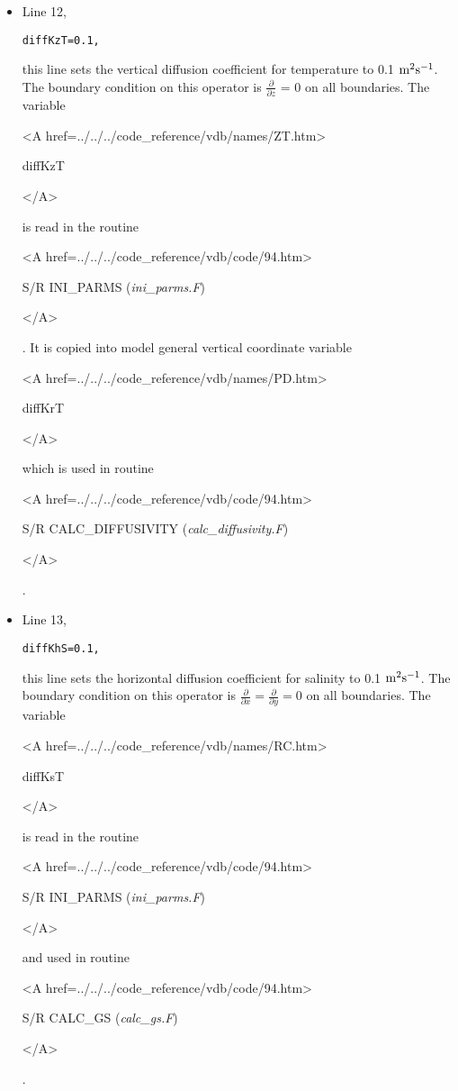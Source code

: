 \begin{itemize}
\item Line 12,
\begin{verbatim}
diffKzT=0.1,
\end{verbatim}
this line sets the vertical diffusion coefficient for temperature
to 0.1 ${\rm m^{2}s^{-1}}$. The boundary condition on this
operator is $\frac{\partial}{\partial z}$ = 0 on all boundaries.
The variable
{\bf
\begin{rawhtml} <A href=../../../code_reference/vdb/names/ZT.htm> \end{rawhtml}
diffKzT
\begin{rawhtml} </A>\end{rawhtml}
}
is read in the routine
{\it
\begin{rawhtml} <A href=../../../code_reference/vdb/code/94.htm> \end{rawhtml}
S/R INI\_PARMS ({\it ini\_parms.F})
\begin{rawhtml} </A>\end{rawhtml}
}.
It is copied into model general vertical coordinate variable
{\bf
\begin{rawhtml} <A href=../../../code_reference/vdb/names/PD.htm> \end{rawhtml}
diffKrT
\begin{rawhtml} </A>\end{rawhtml}
} which is used in routine 
{\it 
\begin{rawhtml} <A href=../../../code_reference/vdb/code/94.htm> \end{rawhtml}
S/R CALC\_DIFFUSIVITY ({\it calc\_diffusivity.F})
\begin{rawhtml} </A>\end{rawhtml}
}.


\item Line 13,
\begin{verbatim}
diffKhS=0.1,
\end{verbatim}
this line sets the horizontal diffusion coefficient for salinity
to 0.1 $\rm m^{2}s^{-1}$. The boundary condition on this
operator is $\frac{\partial}{\partial x}=\frac{\partial}{\partial y}=0$ on
all boundaries.
The variable
{\bf
\begin{rawhtml} <A href=../../../code_reference/vdb/names/RC.htm> \end{rawhtml}
diffKsT
\begin{rawhtml} </A>\end{rawhtml}
}
is read in the routine
{\it
\begin{rawhtml} <A href=../../../code_reference/vdb/code/94.htm> \end{rawhtml}
S/R INI\_PARMS ({\it ini\_parms.F})
\begin{rawhtml} </A>\end{rawhtml}
} and used in routine 
{\it
\begin{rawhtml} <A href=../../../code_reference/vdb/code/94.htm> \end{rawhtml}
S/R CALC\_GS ({\it calc\_gs.F})
\begin{rawhtml} </A>\end{rawhtml}
}.



\end{itemize}
